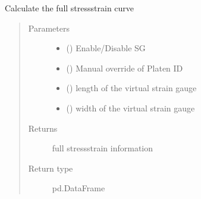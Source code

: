 \documentclass[letterpaper,10pt,english]{sphinxmanual}
\begin{document}
\begin{fulllineitems}
\begin{fulllineitems}
\begin{quote}
\begin{description}
\end{description}\end{quote}

\end{fulllineitems}


\begin{fulllineitems}
\label{\detokenize{openfdem:openfdem.openfdem.Model.complete_stress_strain}}
Calculate the full stress\sphinxhyphen{}strain curve
\begin{quote}\begin{description}
\item[{Parameters}] \leavevmode\begin{itemize}
\item {} 
 () \textendash{} Enable/Disable SG

\item {} 
 () \textendash{} Manual override of Platen ID

\item {} 
 () \textendash{} length of the virtual strain gauge

\item {} 
 () \textendash{} width of the virtual strain gauge

\end{itemize}

\item[{Returns}] \leavevmode
full stress\sphinxhyphen{}strain information

\item[{Return type}] \leavevmode
pd.DataFrame


\end{description}
\end{quote}
\end{fulllineitems}
\end{fulllineitems}
\end{document}
